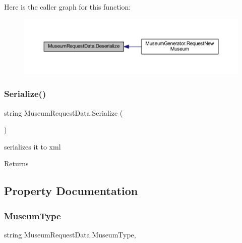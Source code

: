 Here is the caller graph for this function\+:
\nopagebreak
\begin{figure}[H]
\begin{center}
\leavevmode
\includegraphics[width=350pt]{class_museum_request_data_a927b5c1b4ac92161315f7bb717b7c6e6_icgraph}
\end{center}
\end{figure}
\mbox{\label{class_museum_request_data_ac2ab3cbc8d51ee55b5b23fe2cf9e93f3}} 
\subsubsection{\texorpdfstring{Serialize()}{Serialize()}}
{\footnotesize\ttfamily string Museum\+Request\+Data.\+Serialize (\begin{DoxyParamCaption}{ }\end{DoxyParamCaption})}



serializes it to xml 

\begin{DoxyReturn}{Returns}

\end{DoxyReturn}


\subsection{Property Documentation}
\mbox{\label{class_museum_request_data_a2b68f4ddd18c2d01fcd44a02a135b58b}} 
\subsubsection{\texorpdfstring{Museum\+Type}{MuseumType}}
{\footnotesize\ttfamily string Museum\+Request\+Data.\+Museum\+Type\hspace{0.3cm}{\ttfamily [get]}, {\ttfamily [set]}}



